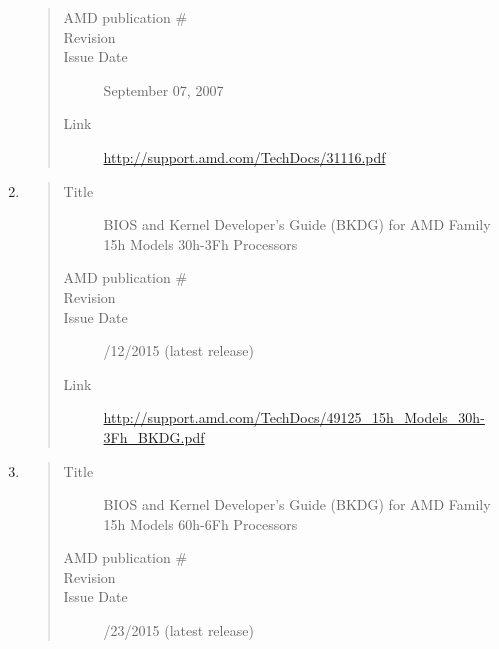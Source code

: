 \documentclass[a4paper,8pt,english]{sphinxmanual}
\begin{document}
\begin{enumerate}
\begin{quote}
\begin{description}
\item[{AMD publication \#}] 

\item[{Revision}] 

\item[{Issue Date}] \leavevmode
September 07, 2007

\item[{Link}] \leavevmode
\href{http://support.amd.com/TechDocs/31116.pdf}{http://support.amd.com/TechDocs/31116.pdf}

\end{description}\end{quote}

\item {} \begin{quote}\begin{description}
\item[{Title}] \leavevmode
BIOS and Kernel Developer's Guide (BKDG) for AMD Family 15h
Models 30h-3Fh Processors

\item[{AMD publication \#}] 

\item[{Revision}] 

\item[{Issue Date}] /12/2015 (latest release)

\item[{Link}] \leavevmode
\href{http://support.amd.com/TechDocs/49125\_15h\_Models\_30h-3Fh\_BKDG.pdf}{http://support.amd.com/TechDocs/49125\_15h\_Models\_30h-3Fh\_BKDG.pdf}

\end{description}\end{quote}

\item {} \begin{quote}\begin{description}
\item[{Title}] \leavevmode
BIOS and Kernel Developer's Guide (BKDG) for AMD Family 15h
Models 60h-6Fh Processors

\item[{AMD publication \#}] 

\item[{Revision}] 

\item[{Issue Date}] /23/2015 (latest release)


\end{description}
\end{quote}
\end{enumerate}
\end{document}
